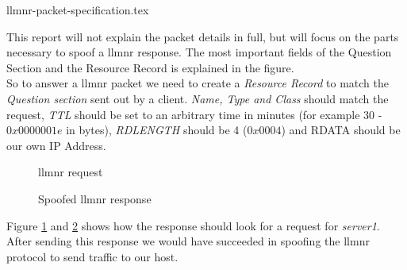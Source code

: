 \documentclass{article}
\begin{document}
{llmnr-packet-specification.tex}

This report will not explain the packet details in full, but will focus on the parts necessary to spoof a \gls{llmnr} response. The most important fields of the Question Section and the Resource Record is explained in the figure.\\
So to answer a \gls{llmnr} packet we need to create a \emph{Resource Record} to match the \emph{Question section} sent out by a client. \emph{Name, Type and Class} should match the request, \emph{TTL} should be set to an arbitrary time in minutes (for example 30 - $0x0000001e$ in bytes), \emph{RDLENGTH} should be 4 ($0x0004$) and RDATA should be our own IP Address.

\begin{figure}[H]
	\scriptsize
	\par
	\centering
	\varwidth{\linewidth}
	
	\endvarwidth
    \par
    
    \caption{\gls{llmnr} request}
    \label{fig:llmnr-request}
\end{figure}

\begin{figure}[H]
	\scriptsize
	\par
	\centering
	\varwidth{\linewidth}
	
	\endvarwidth
    \par
    
    \caption{Spoofed \gls{llmnr} response}
    \label{fig:llmnr-response}
\end{figure}

Figure \ref{fig:llmnr-request} and \ref{fig:llmnr-response} shows how the response should look for a request for \emph{server1}. After sending this response we would have succeeded in spoofing the \gls{llmnr} protocol to send traffic to our host.
\end{document}
